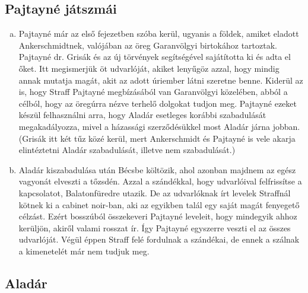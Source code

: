\documentclass{thesis-ekf}
\begin{document}
    \subsection{Pajtayné játszmái}

    \begin{enumerate}[a)]
        \item\label{itm:Corinna-udvarlok} Pajtayné már az első fejezetben szóba kerül, ugyanis a földek, amiket eladott
            Ankerschmidtnek, valójában az öreg Garanvölgyi birtokához tartoztak.
        Pajtayné dr. Grisák és az új törvények segítségével sajátította ki és adta el őket.
        Itt megismerjük öt udvarlóját, akiket lenyűgöz azzal, hogy mindig annak mutatja magát,
            akit az adott úriember látni szeretne benne.
        Kiderül az is, hogy Straff Pajtayné megbízásából van Garanvölgyi közelében, abból a célból,
            hogy az öregúrra nézve terhelő dolgokat tudjon meg.
        Pajtayné ezeket készül felhasználni arra, hogy Aladár esetleges korábbi szabadulását megakadályozza,
            mivel a házassági szerződésükkel most Aladár járna jobban.
        (Grisák itt két tűz közé kerül, mert Ankerschmidt és Pajtayné is vele akarja elintéztetni Aladár szabadulását,
            illetve nem szabadulását.)
        \item\label{itm:Corinna-Bfured} Aladár kiszabadulása után Bécsbe költözik, ahol azonban majdnem az egész vagyonát elveszti a tőzsdén.
        Azzal a szándékkal, hogy udvarlóival felfrissítse a kapcsolatot, Balatonfüredre utazik.
        De az udvarlóknak írt levelek Straffnál kötnek ki a cabinet noir-ban, aki az egyikben talál egy saját magát fenyegető célzást.
        Ezért bosszúból összekeveri Pajtayné leveleit, hogy mindegyik ahhoz kerüljön, akiről valami rosszat ír.
        Így Pajtayné egyszerre veszti el az összes udvarlóját.
        Végül éppen Straff felé fordulnak a szándékai, de ennek a szálnak a kimenetelét már nem tudjuk meg.
    \end{enumerate}

    \subsection{Aladár}
\end{document}
